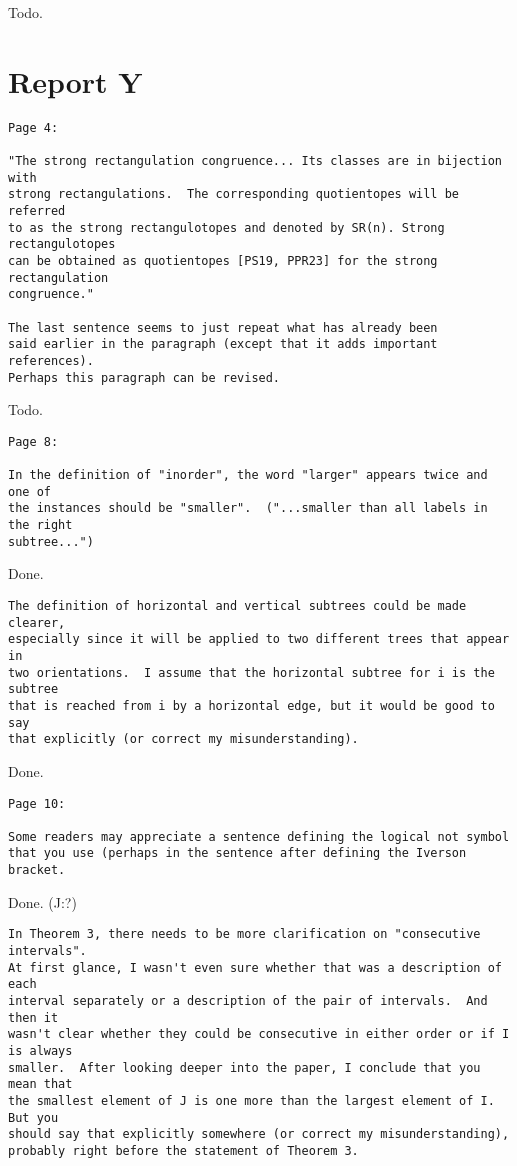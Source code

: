 \documentclass{article}
\begin{document}
Todo.

\section{Report Y}

\begin{verbatim}
Page 4:

"The strong rectangulation congruence... Its classes are in bijection with 
strong rectangulations.  The corresponding quotientopes will be referred 
to as the strong rectangulotopes and denoted by SR(n). Strong rectangulotopes 
can be obtained as quotientopes [PS19, PPR23] for the strong rectangulation 
congruence." 

The last sentence seems to just repeat what has already been 
said earlier in the paragraph (except that it adds important references).  
Perhaps this paragraph can be revised.
\end{verbatim}

Todo.

\begin{verbatim}
Page 8:

In the definition of "inorder", the word "larger" appears twice and one of 
the instances should be "smaller".  ("...smaller than all labels in the right 
subtree...")
\end{verbatim}

Done.

\begin{verbatim}
The definition of horizontal and vertical subtrees could be made clearer, 
especially since it will be applied to two different trees that appear in 
two orientations.  I assume that the horizontal subtree for i is the subtree 
that is reached from i by a horizontal edge, but it would be good to say 
that explicitly (or correct my misunderstanding).
\end{verbatim}

Done.

\begin{verbatim}
Page 10:

Some readers may appreciate a sentence defining the logical not symbol 
that you use (perhaps in the sentence after defining the Iverson bracket.
\end{verbatim}

Done. (J:?)

\begin{verbatim}
In Theorem 3, there needs to be more clarification on "consecutive intervals".  
At first glance, I wasn't even sure whether that was a description of each 
interval separately or a description of the pair of intervals.  And then it 
wasn't clear whether they could be consecutive in either order or if I is always 
smaller.  After looking deeper into the paper, I conclude that you mean that 
the smallest element of J is one more than the largest element of I.  But you 
should say that explicitly somewhere (or correct my misunderstanding), 
probably right before the statement of Theorem 3.
\end{verbatim}
\end{document}
